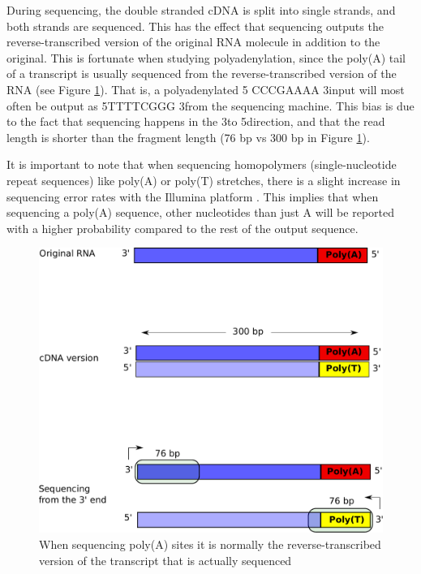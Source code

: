 During sequencing, the double stranded cDNA is split into single strands, and
both strands are sequenced. This has the effect that sequencing outputs the
reverse-transcribed version of the original RNA molecule in addition to the
original. This is fortunate when studying polyadenylation, since the poly(A)
tail of a transcript is usually sequenced from the reverse-transcribed version
of the RNA (see Figure \ref{fig:polyT_seq}). That is, a polyadenylated 5\p
CCCGAAAA 3\p input will most often be output as 5\p TTTTCGGG 3\p from the
sequencing machine. This bias is due to the fact that sequencing happens in the
3\p to 5\p direction, and that the read length is shorter than the fragment
length (76 bp vs 300 bp in Figure \ref{fig:polyT_seq}).

It is important to note that when sequencing homopolymers (single-nucleotide
repeat sequences) like poly(A) or poly(T) stretches, there is a slight increase
in sequencing error rates with the Illumina platform
\cite{minoche_evaluation_2011}. This implies that when sequencing a poly(A)
sequence, other nucleotides than just A will be reported with a higher
probability compared to the rest of the output sequence.

\begin{figure}[htb]
	\begin{center}
		\includegraphics[scale=0.4]{figures/introduction/polyT_sequencing.pdf}
	\end{center}
	\caption{When sequencing poly(A) sites it is normally the
	reverse-transcribed version of the transcript that is actually sequenced}
	\label{fig:polyT_seq}
\end{figure}

